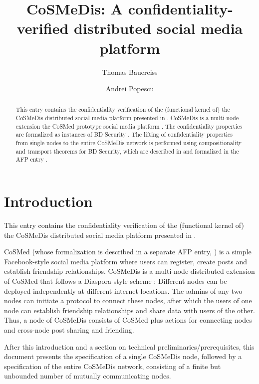 \documentclass[11pt,a4paper]{article}
\begin{document}
\title{CoSMeDis: A confidentiality-verified distributed social media platform}
\author{Thomas Bauereiss \and Andrei Popescu}

\maketitle

\begin{abstract}
 This entry contains the confidentiality verification of the (functional kernel of) the CoSMeDis  distributed social media platform presented in \cite{cosmedis-SandP2017}.  CoSMeDis is a multi-node extension the CoSMed prototype social media platform \cite{cosmed-itp2016,cosmed-jar2018,cosmed-AFP}.
 The confidentiality properties are formalized as instances of BD Security
 \cite{BDsecurity-ITP2021,BDSecurity-AFP}. The lifting of confidentiality properties from single nodes to the entire CoSMeDis network is performed using compositionality and transport theorems for BD Security, which are
 described in \cite{cosmedis-SandP2017} and formalized in the AFP entry \cite{BDSecuritycomp-AFP}.
\end{abstract}

\tableofcontents

\section{Introduction}

This entry contains the confidentiality verification of the (functional kernel of) the CoSMeDis  distributed social media platform presented in \cite{cosmedis-SandP2017}.

CoSMed  \cite{cosmed-itp2016,cosmed-jar2018} (whose formalization is described in a separate AFP entry, \cite{cosmed-AFP}) is a
simple Facebook-style social media platform where users can register,
create posts and establish friendship relationships.
%
CoSMeDis is a multi-node distributed extension of CoSMed that follows a Diaspora-style
scheme \cite{diaspora}: Different nodes can be deployed independently at different internet locations.
The admins of any two nodes can initiate a protocol to connect these nodes, after which
the users of one node can establish friendship relationships and share data with users of the
other. Thus, a node of CoSMeDis consists of CoSMed plus actions for connecting nodes and
cross-node post sharing and friending.

After this introduction and a section on technical preliminaries/prerequisites, this document presents the specification of a single CoSMeDis node, followed by a specification of the entire CoSMeDis network, consisting of a finite but unbounded number of mutually communicating nodes.
\end{document}
